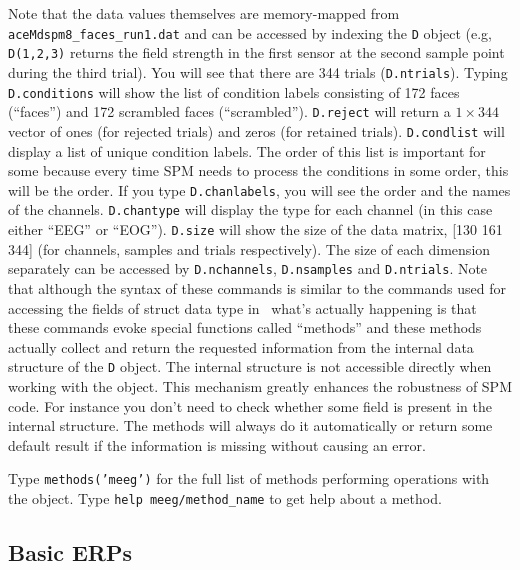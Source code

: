 Note that the data values themselves are memory-mapped from \verb!aceMdspm8_faces_run1.dat! and can be accessed by indexing the \texttt{D} object (e.g, \texttt{D(1,2,3)} returns the field strength in the first sensor at the second sample point during the third trial). You will see that there are 344 trials (\texttt{D.ntrials}). Typing \texttt{D.conditions} will show the list of condition labels consisting of 172 faces (``faces'') and 172 scrambled faces (``scrambled''). \texttt{D.reject} will return a $1\times 344$ vector of ones (for rejected trials) and zeros (for retained trials). \texttt{D.condlist} will display a list of unique condition labels. The order of this list is important for some because every time SPM needs to process the conditions in some order, this will be the order. If you type \texttt{D.chanlabels}, you will see the order and the names of the channels. \texttt{D.chantype} will display the type for each channel (in this case either ``EEG'' or ``EOG''). \texttt{D.size} will show the size of the data matrix, [130 161 344] (for channels, samples and trials respectively). The size of each dimension separately can be accessed by \texttt{D.nchannels}, \texttt{D.nsamples} and \texttt{D.ntrials}. Note that although the syntax of these commands is similar to the commands used for accessing the fields of struct data type in \matlab\ what's actually happening is that these commands evoke special functions called ``methods'' and these methods actually collect and return the requested information from the internal data structure of the \texttt{D} object. The internal structure is not accessible directly when working with the object. This mechanism greatly enhances the robustness of SPM code. For instance you don't need to check whether some field is present in the internal structure. The methods will always do it automatically or return some default result if the information is missing without causing an error.

Type \texttt{methods('meeg')} for the full list of methods performing operations with the object. Type \texttt{help meeg/method\_name} to get help about a method.


\subsection{Basic ERPs}

